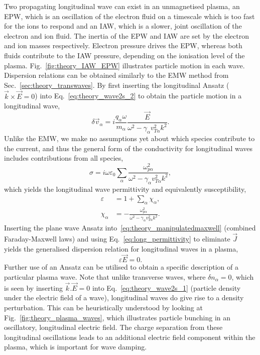 Two propagating longitudinal wave can exist in an unmagnetised plasma, an \ac{EPW}, which is an oscillation of the electron fluid on a timescale which is too fast for the ions to respond and an \ac{IAW}, which is a slower, joint oscillation of the electron and ion fluid.
The inertia of the \ac{EPW} and \ac{IAW} are set by the electron and ion masses respectively.
Electron pressure drives the \ac{EPW}, whereas both fluids contribute to the \ac{IAW} pressure, depending on the ionisation level of the plasma.
Fig.~\ref{fig:theory_IAW_EPW} illustrates particle motion in each wave.
Dispersion relations can be obtained similarly to the \ac{EMW} method from Sec.~\ref{sec:theory_transwaves}.
By first inserting the longitudinal Ansatz ($\vec{k}\times\vec{E}=0$) into Eq.~\ref{eq:theory_wave2s_2} to obtain the particle motion in a longitudinal wave,
\begin{equation}
    \delta \vec{v}_\alpha = i \frac{q_\alpha \omega}{m_\alpha} \frac{\vec{E}}{\omega^2 - \gamma_\alpha v_{T\alpha}^2 k^2}.
\end{equation}
Unlike the \ac{EMW}, we make no assumptions yet about which species contribute to the current, and thus the general form of the conductivity for longitudinal waves includes contributions from all species,
\begin{equation}
    \sigma = i\omega\varepsilon_0 \sum_{\alpha} \frac{\omega_{p\alpha}^2}{\omega^2 - \gamma_\alpha v_{T\alpha}^2 k^2},
\end{equation}
which yields the longitudinal wave permittivity and equivalently susceptibility,
\begin{align}
    \label{eq:long_permittivity}
    \varepsilon &= 1 + \sum_\alpha \chi_\alpha,\\
    \label{eq:long_susceptibility}
    \chi_\alpha  &= - \frac{\omega_{p\alpha}^2}{\omega^2 - \gamma_\alpha v_{T\alpha}^2 k^2}.
\end{align}
Inserting the plane wave Ansatz into~\ref{eq:theory_manipulatedmaxwell} (combined Faraday-Maxwell laws) and using Eq.~\ref{eq:long_permittivity} to eliminate $\vec{J}$ yields the generalised dispersion relation for longitudinal waves in a plasma,
\begin{equation}
    \label{eq:long_disp_rel}
    \varepsilon \vec{E} = 0.
\end{equation}
Further use of an Ansatz can be utilised to obtain a specific description of a particular plasma wave.
Note that unlike transverse waves, where $\delta n_\alpha=0$, which is seen by inserting $\vec{k}.\vec{E}=0$ into Eq.~\ref{eq:theory_wave2s_1} (particle density under the electric field of a wave), longitudinal waves do give rise to a density perturbation.
This can be heuristically understood by looking at Fig.~\ref{fig:theory_plasma_waves}, which illustrates particle bunching in an oscillatory, longitudinal electric field.
The charge separation from these longitudinal oscillations leads to an additional electric field component within the plasma, which is important for wave damping.

